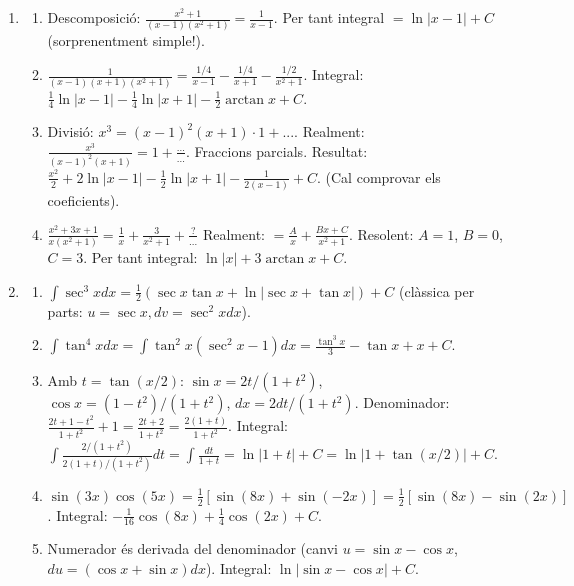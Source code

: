 \documentclass[12pt]{article}
\begin{document}
\begin{enumerate}[label=\arabic*.]
    \item 
    \begin{enumerate}[label=\alph*)]
        \item Descomposició: $\frac{x^2+1}{(x-1)(x^2+1)} = \frac{1}{x-1}$. Per tant integral $=\ln|x-1|+C$ (sorprenentment simple!).
        \item $\frac{1}{(x-1)(x+1)(x^2+1)} = \frac{1/4}{x-1} - \frac{1/4}{x+1} - \frac{1/2}{x^2+1}$. Integral: $\frac{1}{4}\ln|x-1| - \frac{1}{4}\ln|x+1| - \frac{1}{2}\arctan x + C$.
        \item Divisió: $x^3 = (x-1)^2(x+1)\cdot 1 + ...$. Realment: $\frac{x^3}{(x-1)^2(x+1)} = 1 + \frac{...}{...}$. Fraccions parcials. Resultat: $\frac{x^2}{2} + 2\ln|x-1| - \frac{1}{2}\ln|x+1| - \frac{1}{2(x-1)} + C$. (Cal comprovar els coeficients).
        \item $\frac{x^2+3x+1}{x(x^2+1)} = \frac{1}{x} + \frac{3}{x^2+1} + \frac{?}{...}$ Realment: $= \frac{A}{x} + \frac{Bx+C}{x^2+1}$. Resolent: $A=1$, $B=0$, $C=3$. Per tant integral: $\ln|x| + 3\arctan x + C$.
    \end{enumerate}

    \item 
    \begin{enumerate}[label=\alph*)]
        \item $\int \sec^3 x dx = \frac{1}{2}(\sec x \tan x + \ln|\sec x + \tan x|) + C$ (clàssica per parts: $u=\sec x, dv=\sec^2 x dx$).
        \item $\int \tan^4 x dx = \int \tan^2 x(\sec^2 x -1) dx = \frac{\tan^3 x}{3} - \tan x + x + C$.
        \item Amb $t=\tan(x/2)$: $\sin x = 2t/(1+t^2)$, $\cos x = (1-t^2)/(1+t^2)$, $dx=2dt/(1+t^2)$. Denominador: $\frac{2t+1-t^2}{1+t^2} + 1 = \frac{2t+2}{1+t^2} = \frac{2(1+t)}{1+t^2}$. Integral: $\int \frac{2/(1+t^2)}{2(1+t)/(1+t^2)} dt = \int \frac{dt}{1+t} = \ln|1+t|+C = \ln|1+\tan(x/2)|+C$.
        \item $\sin(3x)\cos(5x) = \frac{1}{2}[\sin(8x) + \sin(-2x)] = \frac{1}{2}[\sin(8x) - \sin(2x)]$. Integral: $-\frac{1}{16}\cos(8x) + \frac{1}{4}\cos(2x)+C$.
        \item Numerador és derivada del denominador (canvi $u=\sin x-\cos x$, $du=(\cos x+\sin x)dx$). Integral: $\ln|\sin x - \cos x|+C$.
    \end{enumerate}


\end{enumerate}
\end{document}
